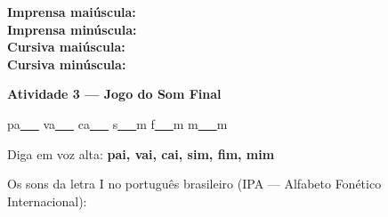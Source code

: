 \begin{consolidacao}
\begin{center}
\textbf{Imprensa mai\'uscula:} \underline{\hspace{1cm}} \underline{\hspace{1cm}} \underline{\hspace{1cm}} \underline{\hspace{1cm}} \underline{\hspace{1cm}}\\[0.5em]
\textbf{Imprensa min\'uscula:} \underline{\hspace{1cm}} \underline{\hspace{1cm}} \underline{\hspace{1cm}} \underline{\hspace{1cm}} \underline{\hspace{1cm}}\\[0.5em]
\textbf{Cursiva mai\'uscula:} \underline{\hspace{1cm}} \underline{\hspace{1cm}} \underline{\hspace{1cm}} \underline{\hspace{1cm}} \underline{\hspace{1cm}}\\[0.5em]
\textbf{Cursiva min\'uscula:} \underline{\hspace{1cm}} \underline{\hspace{1cm}} \underline{\hspace{1cm}} \underline{\hspace{1cm}} \underline{\hspace{1cm}}
\end{center}

\textbf{Atividade 3 --- Jogo do Som Final}


\begin{center}
pa\underline{~~~} \quad va\underline{~~~} \quad ca\underline{~~~} \quad s\underline{~~~}m \quad f\underline{~~~}m \quad m\underline{~~~}m
\end{center}
Diga em voz alta: \textbf{pai, vai, cai, sim, fim, mim}

\end{consolidacao}


\begin{sonsdaletra}
Os sons da letra I no portugu\^es{} brasileiro (IPA --- Alfabeto Fon\'etico Internacional):

\end{sonsdaletra}

